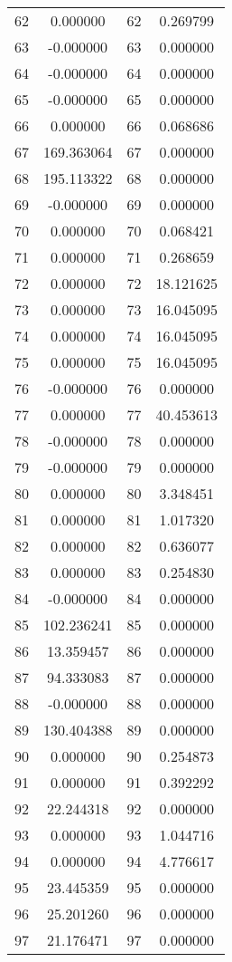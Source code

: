 \documentclass[12pt]{article}
\begin{document}
\begin{longtable}{@{}cccc@{}}
62 & 0.000000 & 62 & 0.269799 \\
63 & -0.000000 & 63 & 0.000000 \\
64 & -0.000000 & 64 & 0.000000 \\
65 & -0.000000 & 65 & 0.000000 \\
66 & 0.000000 & 66 & 0.068686 \\
67 & 169.363064 & 67 & 0.000000 \\
68 & 195.113322 & 68 & 0.000000 \\
69 & -0.000000 & 69 & 0.000000 \\
70 & 0.000000 & 70 & 0.068421 \\
71 & 0.000000 & 71 & 0.268659 \\
72 & 0.000000 & 72 & 18.121625 \\
73 & 0.000000 & 73 & 16.045095 \\
74 & 0.000000 & 74 & 16.045095 \\
75 & 0.000000 & 75 & 16.045095 \\
76 & -0.000000 & 76 & 0.000000 \\
77 & 0.000000 & 77 & 40.453613 \\
78 & -0.000000 & 78 & 0.000000 \\
79 & -0.000000 & 79 & 0.000000 \\
80 & 0.000000 & 80 & 3.348451 \\
81 & 0.000000 & 81 & 1.017320 \\
82 & 0.000000 & 82 & 0.636077 \\
83 & 0.000000 & 83 & 0.254830 \\
84 & -0.000000 & 84 & 0.000000 \\
85 & 102.236241 & 85 & 0.000000 \\
86 & 13.359457 & 86 & 0.000000 \\
87 & 94.333083 & 87 & 0.000000 \\
88 & -0.000000 & 88 & 0.000000 \\
89 & 130.404388 & 89 & 0.000000 \\
90 & 0.000000 & 90 & 0.254873 \\
91 & 0.000000 & 91 & 0.392292 \\
92 & 22.244318 & 92 & 0.000000 \\
93 & 0.000000 & 93 & 1.044716 \\
94 & 0.000000 & 94 & 4.776617 \\
95 & 23.445359 & 95 & 0.000000 \\
96 & 25.201260 & 96 & 0.000000 \\
97 & 21.176471 & 97 & 0.000000 \\

\end{longtable}
\end{document}
